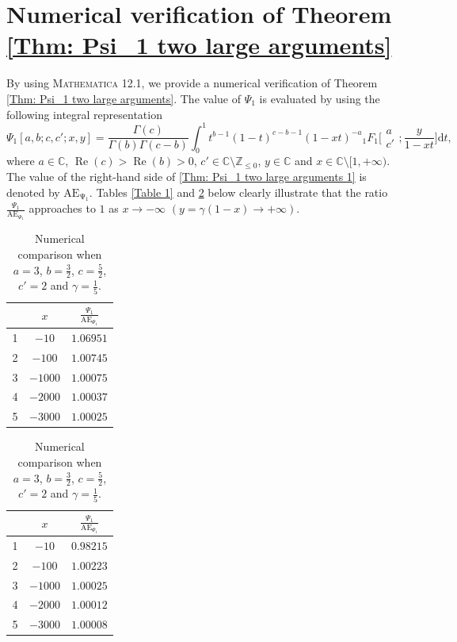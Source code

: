 \documentclass[10pt,a4paper]{amsart}
\numberwithin{equation}{section}
\newcommand{\ZZ}{\ensuremath{\mathbb{Z}}}
\begin{document}
\appendix
\section{Numerical verification of Theorem \ref{Thm: Psi_1 two large arguments}}\label{Appendix A}

By using \textsc{Mathematica} 12.1, we provide a numerical verification of Theorem \ref{Thm: Psi_1 two large arguments}. The value of $\Psi_1$ is evaluated by using the following integral representation
	\[
	\Psi_1[a,b;c,c';x,y]
	=\frac{\Gamma(c)}{\Gamma(b)\Gamma(c-b)}\int_{0}^{1}t^{b-1}(1-t)^{c-b-1}(1-xt)^{-a}{}_{1}F_{1}\biggl[\begin{matrix}
		a\\
		c'
	\end{matrix};\frac{y}{1-xt}\biggr]\mathrm{d}t,
	\]
	where $a\in\mathbb{C}$, $\operatorname{Re}(c)>\operatorname{Re}(b)>0$, $c'\in\mathbb{C}\setminus\ZZ_{\leqslant 0}$, $y\in\mathbb{C}$ and $x\in\mathbb{C}\setminus[1,+\infty)$. The value of the right-hand side of \eqref{Thm: Psi_1 two large arguments 1} is denoted by $\mathrm{AE_{\Psi_1}}$. Tables \ref{Table 1} and \ref{Table 2} below clearly illustrate that the ratio $\frac{\Psi_1}{\mathrm{AE}_{\Psi_1}}$ approaches to $1$ as $x\rightarrow-\infty$ $(y=\gamma(1-x)\rightarrow+\infty)$.
\begin{table}[h]
	\renewcommand{\arraystretch}{1.2}
	\centering
	\caption{Numerical comparison when $c'=a=3$, $b=\frac{3}{2}$, $c=\frac{5}{2}$ and $\gamma=1$.}\label{Table 1}
\vspace{1mm}

	\begin{tabular}{|c|cc|}\hline\hline
		~ & $x$ & $\frac{\Psi_1}{\mathrm{AE}_{\Psi_1}}$ \\ \hline\hline
		1 & $-10$ & $1.06951$ \\ \hline
		2 & $-100$ & $1.00745$ \\ \hline
		3 & $-1000$ & $1.00075$ \\ \hline
		4 & $-2000$ & $1.00037$ \\ \hline
		5 & $-3000$ & $1.00025$
		\\ \hline\hline
	\end{tabular}
	\caption{Numerical comparison when $a=3$, $b=\frac{3}{2}$, $c=\frac{5}{2}$, $c'=2$ and $\gamma=\frac{1}{5}$.}\label{Table 2}
\vspace{1mm}

	\begin{tabular}{|c|cc|}\hline\hline
		~ & $x$ & $\frac{\Psi_1}{\mathrm{AE}_{\Psi_1}}$ \\ \hline\hline
		1 & $-10$ & $0.98215$ \\ \hline
		2 & $-100$ & $1.00223$ \\ \hline
		3 & $-1000$ & $1.00025$ \\ \hline
		4 & $-2000$ & $1.00012$ \\ \hline
		5 & $-3000$ & $1.00008$
		\\ \hline\hline
	\end{tabular}
\end{table}
\end{document}

